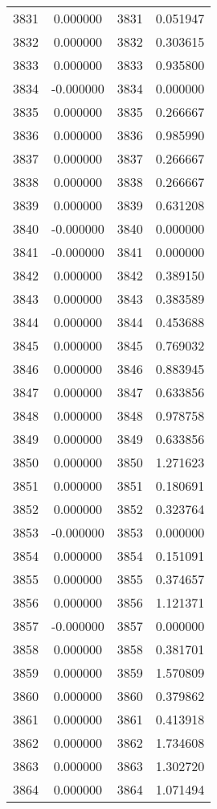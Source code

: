 \documentclass[12pt]{article}
\begin{document}
\begin{longtable}{@{}cccc@{}}
3831 & 0.000000 & 3831 & 0.051947 \\
3832 & 0.000000 & 3832 & 0.303615 \\
3833 & 0.000000 & 3833 & 0.935800 \\
3834 & -0.000000 & 3834 & 0.000000 \\
3835 & 0.000000 & 3835 & 0.266667 \\
3836 & 0.000000 & 3836 & 0.985990 \\
3837 & 0.000000 & 3837 & 0.266667 \\
3838 & 0.000000 & 3838 & 0.266667 \\
3839 & 0.000000 & 3839 & 0.631208 \\
3840 & -0.000000 & 3840 & 0.000000 \\
3841 & -0.000000 & 3841 & 0.000000 \\
3842 & 0.000000 & 3842 & 0.389150 \\
3843 & 0.000000 & 3843 & 0.383589 \\
3844 & 0.000000 & 3844 & 0.453688 \\
3845 & 0.000000 & 3845 & 0.769032 \\
3846 & 0.000000 & 3846 & 0.883945 \\
3847 & 0.000000 & 3847 & 0.633856 \\
3848 & 0.000000 & 3848 & 0.978758 \\
3849 & 0.000000 & 3849 & 0.633856 \\
3850 & 0.000000 & 3850 & 1.271623 \\
3851 & 0.000000 & 3851 & 0.180691 \\
3852 & 0.000000 & 3852 & 0.323764 \\
3853 & -0.000000 & 3853 & 0.000000 \\
3854 & 0.000000 & 3854 & 0.151091 \\
3855 & 0.000000 & 3855 & 0.374657 \\
3856 & 0.000000 & 3856 & 1.121371 \\
3857 & -0.000000 & 3857 & 0.000000 \\
3858 & 0.000000 & 3858 & 0.381701 \\
3859 & 0.000000 & 3859 & 1.570809 \\
3860 & 0.000000 & 3860 & 0.379862 \\
3861 & 0.000000 & 3861 & 0.413918 \\
3862 & 0.000000 & 3862 & 1.734608 \\
3863 & 0.000000 & 3863 & 1.302720 \\
3864 & 0.000000 & 3864 & 1.071494 \\

\end{longtable}
\end{document}
